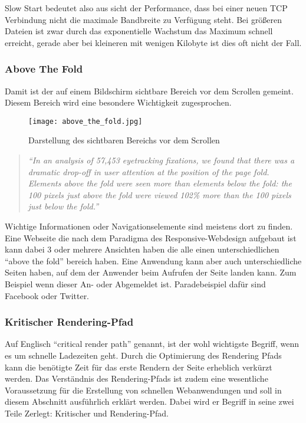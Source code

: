 			Slow Start bedeutet also aus sicht der Performance, dass bei einer neuen TCP Verbindung nicht die maximale Bandbreite zu Verfügung steht. Bei größeren Dateien ist zwar durch das exponentielle Wachstum das Maximum schnell erreicht, gerade aber bei kleineren mit wenigen Kilobyte ist dies oft nicht der Fall.

		
		\subsubsection{Above The Fold} %
		\label{ssub:above_the_fold}
			Damit ist der auf einem Bildschirm sichtbare Bereich vor dem Scrollen gemeint. Diesem Bereich wird eine besondere Wichtigkeit zugesprochen.
			\begin{figure}[htbp]
				\begin{center}
					\texttt{[image: above\_the\_fold.jpg]}
					\caption{Darstellung des sichtbaren Bereichs vor dem Scrollen}
					\label{fig:above_the_fold}
				\end{center}
			\end{figure}

			\begin{quote}
				 \textit{"`In an analysis of 57,453 eyetracking fixations, we found that there was a dramatic drop-off in user attention at the position of the page fold. Elements above the fold were seen more than elements below the fold: the 100 pixels just above the fold were viewed 102\% more than the 100 pixels just below the fold."'} \autocite{nng15}
			\end{quote}

			Wichtige Informationen oder Navigationselemente sind meistens dort zu finden. Eine Webseite die nach dem Paradigma des Responsive-Webdesign aufgebaut ist kann dabei 3 oder mehrere Ansichten haben die alle einen unterschiedlichen "`above the fold"' bereich haben. Eine Anwendung kann aber auch unterschiedliche Seiten haben, auf dem der Anwender beim Aufrufen der Seite landen kann. Zum Beispiel wenn dieser An- oder Abgemeldet ist. Paradebeispiel dafür sind Facebook oder Twitter.

		\subsubsection{Kritischer Rendering-Pfad} %
		\label{ssub:critical_render_path}
			Auf Englisch "`critical render path"' genannt, ist der wohl wichtigste Begriff, wenn es um schnelle Ladezeiten geht. Durch die Optimierung des Rendering Pfads kann die benötigte Zeit für das erste Rendern der Seite erheblich verkürzt werden. Das Verständnis des Rendering-Pfads ist zudem eine wesentliche Voraussetzung für die Erstellung von schnellen Webanwendungen und soll in diesem Abschnitt ausführlich erklärt werden. Dabei wird er Begriff in seine zwei Teile Zerlegt: Kritischer und Rendering-Pfad.\\

